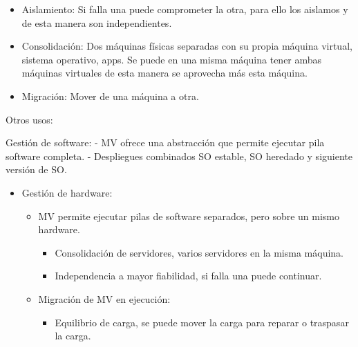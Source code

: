 \documentclass[12pt, twoside, openright]{report} %
\begin{document}
\begin{itemize}
	\item Aislamiento: Si falla una puede comprometer la otra, para ello los
	      aislamos y de esta manera son independientes.
	      \begin{figure}[H]
		      {\def\svgwidth{.7\textwidth}
			      }
	      \end{figure}
	\item Consolidación: Dos máquinas físicas separadas con su propia
	      máquina virtual, sistema operativo, apps. Se puede en una misma
	      máquina tener ambas máquinas virtuales de esta manera se aprovecha
	      más esta máquina.
	      \begin{figure}[H]
		      {\def\svgwidth{.7\textwidth}
			      }
	      \end{figure}
	\item Migración: Mover de una máquina a otra.
	      \begin{figure}[H]
		      {\def\svgwidth{.7\textwidth}
			      }
	      \end{figure}
\end{itemize}

Otros usos:

Gestión de software: - MV ofrece una abstracción que permite
ejecutar pila software completa. - Despliegues combinados SO
estable, SO heredado y siguiente versión de SO.

\begin{itemize}

	\item Gestión de hardware:

	      \begin{itemize}

		      \item MV permite ejecutar pilas de software separados, pero sobre un
		            mismo hardware.

		            \begin{itemize}

			            \item Consolidación de servidores, varios servidores en la misma
			                  máquina.
			            \item Independencia a mayor fiabilidad, si falla una puede
			                  continuar.
		            \end{itemize}
		      \item Migración de MV en ejecución:

		            \begin{itemize}

			            \item Equilibrio de carga, se puede mover la carga para reparar o
			                  traspasar la carga.
		            \end{itemize}
	      \end{itemize}
\end{itemize}
\end{document}
